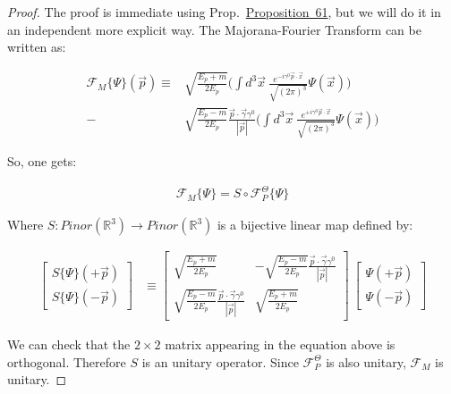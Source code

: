 \documentclass[11pt]{book}
\begin{document}
\emph{Proof.} The proof is immediate using
Prop.~\protect\hyperlink{prop:unitary}{Proposition~61}, but we will do
it in an independent more explicit way. The Majorana-Fourier Transform
can be written as:

\begin{equation}\begin{aligned}
\mathcal{F}_M\{\Psi\}(\vec{p})\equiv& \sqrt{\frac{E_p+m}{2E_p}}\Big(\int d^3\vec{x}\ \frac{e^{-i\gamma^0\vec{p}\cdot
  \vec{x}}}{\sqrt{(2\pi)^3}}\Psi(\vec{x})\Big)\\
-&\sqrt{\frac{E_p-m}{2E_p}}\frac{\vec{p}\cdot\vec{\gamma}\gamma^0}{|\vec{p}|}\Big(\int d^3\vec{x}\ \frac{e^{+i\gamma^0\vec{p}\cdot
  \vec{x}}}{\sqrt{(2\pi)^3}}\Psi(\vec{x})\Big)\end{aligned}\end{equation}

So, one gets:

\begin{equation}\begin{aligned}
\mathcal{F}_{M}\{\Psi\}=S \circ \mathcal{F}^\Theta_{P}\{\Psi\}\end{aligned}\end{equation}

Where \(S:Pinor(\mathbb{R}^3)\to Pinor(\mathbb{R}^3)\) is a bijective
linear map defined by:

\begin{equation}\begin{aligned}
\left[ \begin{array}{l}
S\{\Psi\}(+\vec{p})\\
S\{\Psi\}(-\vec{p})
\end{array}
\right]&\equiv
\left[ \begin{array}{cc}
\sqrt{\frac{E_p+m}{2E_p}} 
& -\sqrt{\frac{E_p-m}{2E_p}}\frac{\vec{p}\cdot\vec{\gamma}\gamma^0}{|\vec{p}|}\\
\sqrt{\frac{E_p-m}{2E_p}}\frac{\vec{p}\cdot\vec{\gamma}\gamma^0}{|\vec{p}|}
&\sqrt{\frac{E_p+m}{2E_p}}
\end{array}
\right]\ 
\left[ \begin{array}{l}
\Psi(+\vec{p})\\
\Psi(-\vec{p})
\end{array}
\right]\end{aligned}\end{equation}

We can check that the \(2\times 2\) matrix appearing in the equation
above is orthogonal. Therefore \(S\) is an unitary operator. Since
\(\mathcal{F}^\Theta_{P}\) is also unitary, \(\mathcal{F}_{M}\) is
unitary.~◻
\end{document}
